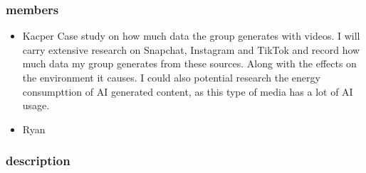 \documentclass{article}
\begin{document}
\subsubsection{members}
\begin{itemize}
    \item Kacper
    Case study on how much data the group generates with videos.
    I will carry extensive research on Snapchat, Instagram and TikTok and record how much data my group generates from these sources.
    Along with the effects on the environment it causes.
    I could also potential research the energy consumpttion of AI generated content, as this type of media has a lot of AI usage.
    
    
    \item Ryan
\end{itemize}
\subsubsection{description}
\end{document}
